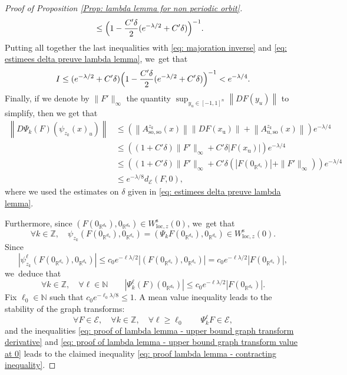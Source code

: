 \documentclass[JEP,XML,SOM,Unicode,NoEqCountersInSection,NoFloatCountersInSection,published]{cedram}
\newcommand{\loc}{\mathrm{loc}}
\newcommand{\rs}{\mathrm{s}}
\newcommand{\rso}{\mathrm{so}}
\newcommand{\ru}{\mathrm{u}}
\theoremstyle{definition}
\theoremstyle{plain}
\newcommand{\Ecal}{\mathcal{E}}
\newcommand{\N}{\mathbb{N}}
\newcommand{\R}{\mathbb{R}}
\newcommand{\Z}{\mathbb{Z}}
\begin{document}
\begin{appendix}
\begin{proof}[Proof of Proposition \ref{Prop: lambda lemma for non periodic orbit}]
\begin{align*}
&\leq \Bigl(1 - \frac{C' \delta}{2} (e^{- \lambda/2 } + C' \delta) \Bigr)^{-1}.
\end{align*}
Putting all together the last inequalities with \eqref{eq: majoration inverse} and \eqref{eq: estimees delta preuve lambda lemma}, we~get that
\[
I \leq (e^{-\lambda/ 2} + C' \delta) \Bigl(1 - \frac{C' \delta}{2} (e^{- \lambda/ 2} + C' \delta) \Bigr)^{-1} < e^{- \lambda / 4}.
\]
Finally, if we denote by $\|F'\|_{\infty}$ the quantity $\sup_{y_u \in [-1,1]^n}\left\| DF (y_u) \right\|$ to simplify, then we get that
\begin{equation}\label{eq: proof of lambda lemma - upper bound graph transform derivative}
\begin{split}
\left\| D \Psi_k (F) \left(\psi_{z_k} (x)_u \right) \right\| &\leq \left(\left\| A_{\rso,\rso}^{z_k} (x)\right\| \left\| DF (x_\ru) \right\| + \left\| A_{\ru,\rso}^{z_k} (x) \right\| \right) e^{- \lambda/4}\\
&\leq \left((1 + C' \delta) \|F'\|_{\infty} + C' \delta |F(x_\ru)| \right)e^{- \lambda/4} \\
&\leq \left((1 + C' \delta) \|F'\|_{\infty} + C' \delta \left(|F(0_{\R^{d_\ru}})| + \|F'\|_{\infty} \right) \right) e^{- \lambda / 4}
\\
&\leq e^{- \lambda /8} d_{\Ecal}(F, 0),
\end{split}
\end{equation}
where we used the estimates on $\delta$ given in \eqref{eq: estimees delta preuve lambda lemma}.

Furthermore, since $(F(0_{\R^{d_\ru}}), 0_{\R^{d_\ru}}) \in W_{\loc,z}^\rs (0)$, we~get that
\[
\forall k \in \Z, \quad \psi_{z_k} (F(0_{\R^{d_\ru}}), 0_{\R^{d_\ru}}) = (\Psi_k F (0_{\R^{d_\ru}}), 0_{\R^{d_\ru}}) \in W_{\loc,z}^\rs (0).
\]
Since
\[
| \psi_{z_k}^{\ell} (F(0_{\R^{d_\ru}}), 0_{\R^{d_\ru}})| \leq c_0 e^{- \ell \lambda / 2} | (F(0_{\R^{d_\ru}}), 0_{\R^{d_\ru}})| = c_0 e^{- \ell \lambda / 2} |F(0_{\R^{d_\ru}})|,
\]
we~deduce that
\begin{equation}\label{eq: proof of lambda lemma - upper bound graph transform value at 0}
\forall k \in \Z, \quad \forall \ell \in \N \qquad |\Psi_k^{\ell} (F) (0_{\R^{d_\ru}})| \leq c_0 e^{- \ell\lambda / 2} |F(0_{\R^{d_\ru}})|.
\end{equation}
Fix $\ell_0 \in \N$ such that $c_0 e^{-\ell_0 \lambda /8} \leq 1$. A mean value inequality leads to the stability of the graph transforms:
\begin{equation}\label{eq: proof of lambda lemma - stability of the graph transforms}
\forall F \in \Ecal, \quad \forall k \in \Z, \quad \forall \ell \geq \ell_0 \qquad \Psi_k^{\ell} F \in \Ecal,
\end{equation}
and the inequalities \eqref{eq: proof of lambda lemma - upper bound graph transform derivative} and \eqref{eq: proof of lambda lemma - upper bound graph transform value at 0} leads to the claimed inequality \eqref{eq: proof lambda lemma - contracting inequality}.


\end{proof}
\end{appendix}
\end{document}
